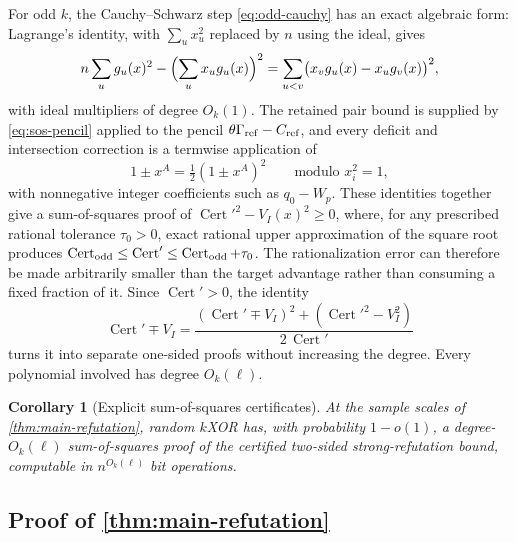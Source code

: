 \documentclass[11pt]{article}
\newtheorem{corollary}[corollary]{Corollary}
\theoremstyle{definition}
\theoremstyle{remark}
\newcommand{\1}{\mathbf 1}
\DeclareMathOperator{\Cert}{Cert}
\numberwithin{equation}{section}
\begin{document}
For odd $k$, the Cauchy--Schwarz step \cref{eq:odd-cauchy} has an exact
algebraic form: Lagrange's identity, with $\sum_ux_u^2$ replaced by $n$
using the ideal, gives
\begin{equation}\label{eq:sos-lagrange}
 n\sum_ug_u(x)^2-\Bigl(\sum_ux_ug_u(x)\Bigr)^2
 =\sum_{u<v}\bigl(x_vg_u(x)-x_ug_v(x)\bigr)^2 ,
\end{equation}
with ideal multipliers of degree $O_k(1)$.  The retained pair bound is
supplied by \cref{eq:sos-pencil} applied to the pencil
$\theta\Gamma_{\rm ref}-C_{\rm ref}$, and every deficit and intersection
correction is a termwise application of
\begin{equation}\label{eq:sos-monomial}
 1\pm x^A=\tfrac12(1\pm x^A)^2
 \qquad\text{modulo }x_i^2=1,
\end{equation}
with nonnegative integer coefficients such as $q_0-W_p$.  These
identities together give a sum-of-squares proof of
$\Cert'^2-V_I(x)^2\ge0$, where, for any prescribed rational tolerance
$\tau_0>0$, exact rational upper approximation of the square root produces
$\Cert_{\rm odd}\le\Cert'\le\Cert_{\rm odd}+\tau_0$.  The
rationalization error can therefore be made arbitrarily smaller than the
target advantage rather than consuming a fixed fraction of it.  Since
$\Cert'>0$, the identity
\[
 \Cert'\mp V_I
 =\frac{(\Cert'\mp V_I)^2+(\Cert'^2-V_I^2)}{2\,\Cert'}
\]
turns it into separate one-sided proofs without increasing the degree.
Every polynomial involved has degree $O_k(\ell)$.

\begin{corollary}[Explicit sum-of-squares certificates]\label{cor:sos}
At the sample scales of \cref{thm:main-refutation}, random $k$XOR has,
with probability $1-o(1)$, a degree-$O_k(\ell)$ sum-of-squares proof of
the certified two-sided strong-refutation bound, computable in
$n^{O_k(\ell)}$ bit operations.
\end{corollary}

\subsection{Proof of \texorpdfstring{\cref{thm:main-refutation}}{the refutation theorem}}
\end{document}

